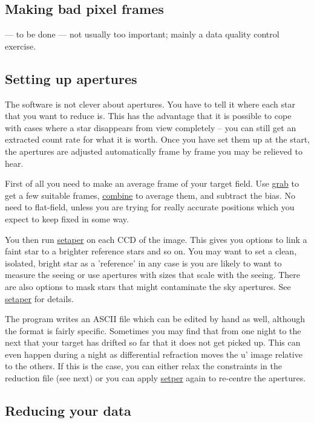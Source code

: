 \documentclass[10pt,a4paper,twocolumn]{article}
\newcommand{\main}{http://quetzel.csc.warwick.ac.uk/phsaap/software}
\newcommand{\ultracam}{\main/ultracam/html}
\begin{document}
\subsection{Making bad pixel frames}

 --- to be done --- not usually too important; mainly a data quality control
exercise.

\subsection{Setting up apertures}

\label{sec:apertures}

The software is not clever about apertures. You have to tell it where
each star that you want to reduce is. This has the advantage that it
is possible to cope with cases where a star disappears from view completely
-- you can still get an extracted count rate for what it is worth. Once you
have set them up at the start, the apertures are adjusted automatically frame by
frame you may be relieved to hear.

First of all you need to make an average frame of your target field. Use
\href{\ultracam/grab.html}{grab} to get a few suitable frames,
\href{\ultracam/combine.html}{combine} to average them, and subtract the bias.
No need to flat-field, unless you are trying for really accurate positions which
you expect to keep fixed in some way.

You then run \href{\ultracam/setaper.html}{setaper} on each CCD of the image.
This gives you options to link a faint star to a brighter reference stars and
so on. You may want to set a clean, isolated, bright star as a 'reference' in
any case is you are likely to want to measure the seeing or use apertures with
sizes that scale with the seeing. There are also options to mask stars that
might contaminate the sky apertures. See \href{\ultracam/setaper.html}{setaper}
for details.

The program writes an ASCII file which can be edited by hand as well, although
the format is fairly specific. Sometimes you may find that from one
night to the next that your target has drifted so far that it does not
get picked up. This can even happen during a night as differential
refraction moves the u' image relative to the others. If this is the
case, you can either relax the constraints in the reduction file (see
next) or you can apply \href{\ultracam/setaper.html}{setper} again to
re-centre the apertures.

\subsection{Reducing your data}
\end{document}
